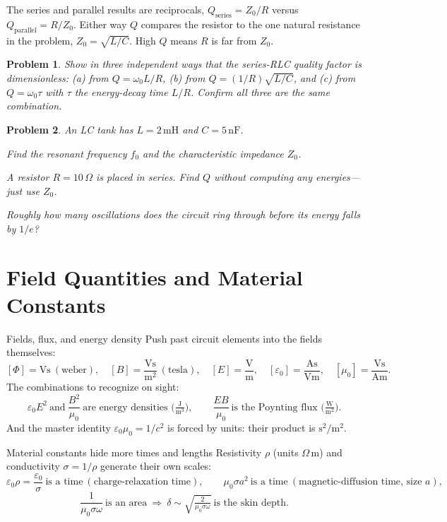 \documentclass[11pt]{article}
\newcommand{\clearpts}{\addtocounter{tpts}{\value{cpts}} \setcounter{cpts}{0}}
\newcommand{\pts}[1]{\clearpts \setcounter{cpts}{#1}}
\theoremstyle{mystyle}
\newtheorem{pproblem}{Problem}
\newcommand{\V}{\text{V}}
\newcommand{\A}{\text{A}}
\newcommand{\s}{\text{s}}
\newcommand{\m}{\text{m}}
\newcommand{\Ohm}{\Omega}
\begin{document}
\begin{psremark*}{}{}
The series and parallel results are reciprocals, $Q_{\text{series}}=Z_0/R$ versus
$Q_{\text{parallel}}=R/Z_0$. Either way $Q$ compares the resistor to the one natural
resistance in the problem, $Z_0=\sqrt{L/C}$. High $Q$ means $R$ is far from $Z_0$.
\end{psremark*}

\pts{4}
\begin{pproblem}
Show in three independent ways that the series-RLC quality factor is dimensionless:
(a) from $Q=\omega_0 L/R$, (b) from $Q=(1/R)\sqrt{L/C}$, and (c) from
$Q=\omega_0\tau$ with $\tau$ the energy-decay time $L/R$. Confirm all three are the
same combination.
\end{pproblem}

\pts{5}
\begin{pproblem}
An LC tank has $L = 2\,\text{mH}$ and $C = 5\,\text{nF}$.
\begin{subpart}
\item Find the resonant frequency $f_0$ and the characteristic impedance $Z_0$.
\item A resistor $R = 10\,\Omega$ is placed in series. Find $Q$ without computing any
energies---just use $Z_0$.
\item Roughly how many oscillations does the circuit ring through before its energy
falls by $1/e$?
\end{subpart}
\end{pproblem}

\section{Field Quantities and Material Constants}

\begin{psidea}{Fields, flux, and energy density}{}
Push past circuit elements into the fields themselves:
\[
[\Phi]=\V\s\ (\text{weber}),\quad
[B]=\frac{\V\s}{\m^2}\ (\text{tesla}),\quad
[E]=\frac{\V}{\m},\quad
[\varepsilon_0]=\frac{\A\s}{\V\m},\quad
[\mu_0]=\frac{\V\s}{\A\m}.
\]
The combinations to recognize on sight:
\[
\varepsilon_0 E^2 \ \text{and}\ \frac{B^2}{\mu_0}\ \text{are energy densities }
\Big(\tfrac{\text{J}}{\m^3}\Big),\qquad
\frac{EB}{\mu_0}\ \text{is the Poynting flux }\Big(\tfrac{\text{W}}{\m^2}\Big).
\]
And the master identity $\varepsilon_0\mu_0 = 1/c^2$ is forced by units: their product
is $\s^2/\m^2$.
\end{psidea}

\begin{psidea}{Material constants hide more times and lengths}{}
Resistivity $\rho$ (units $\Ohm\,\m$) and conductivity $\sigma=1/\rho$ generate their
own scales:
\[
\varepsilon_0\rho = \frac{\varepsilon_0}{\sigma}\ \text{is a time}
\ (\text{charge-relaxation time}),\qquad
\mu_0\sigma a^2\ \text{is a time}\ (\text{magnetic-diffusion time, size } a),
\]
\[
\frac{1}{\mu_0\sigma\omega}\ \text{is an area}
\ \Longrightarrow\ \delta\sim\sqrt{\tfrac{2}{\mu_0\sigma\omega}}\ \text{is the skin depth.}
\]
\end{psidea}
\end{document}
